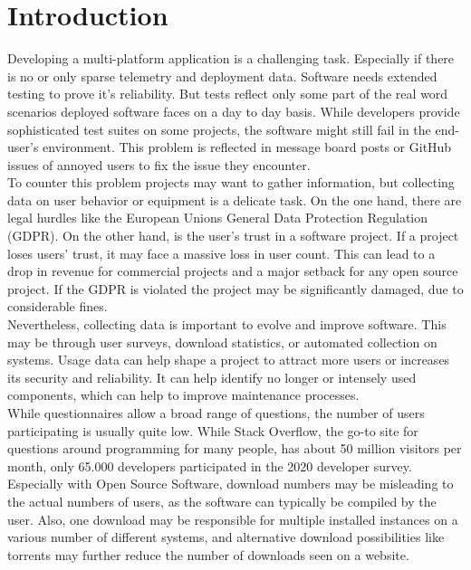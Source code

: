 \chapter{Introduction}
\label{chap:introduction}
%
Developing a multi-platform application is a challenging task. Especially if 
there is no or only sparse telemetry and deployment data. Software needs extended testing to prove it's reliability. But tests reflect only some part of the real word scenarios deployed software faces on a day to day basis. While developers provide sophisticated test suites on some projects, the software might still fail in the end-user's environment. This problem is reflected in message board posts or GitHub issues of annoyed users to fix the issue they encounter.\\

To counter this problem projects may want to gather information, but 
collecting data on user behavior or equipment is a delicate task. On the one hand, there are legal hurdles like the European Unions General Data Protection Regulation (GDPR). On the other hand, is the user's trust in a software project. If a project loses users' trust, it may face a massive loss in user count. This can lead to a drop in revenue for commercial projects and a major setback for any open source project. If the GDPR is violated the project may be significantly damaged, due to considerable fines.\\
Nevertheless, collecting data is important to evolve and improve software. This may be through user surveys, download statistics, or automated collection on systems.
Usage data can help shape a project to attract more users or increases its security and reliability.
It can help identify no longer or intensely used components, which can help to improve maintenance processes.\\

While questionnaires allow a broad range of questions, the number of users participating is usually quite low. While Stack Overflow, the go-to site for questions around programming for many people, has about 50 million visitors per month, only 65.000 developers participated in the 2020 developer survey\cite{noauthor_stack_nodate}.
Especially with Open Source Software, download numbers may be misleading to the actual numbers of users, as the software can typically be compiled by the user. Also, one download may be responsible for multiple installed instances on a various number of different systems, and alternative download possibilities like torrents may further reduce the number of downloads seen on a website.\\


